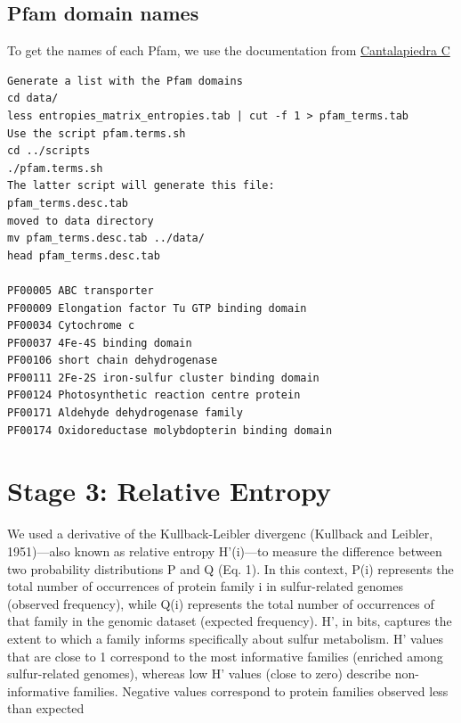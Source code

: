 \documentclass[a4paper,11pt]{report}
\begin{document}
\subsection{Pfam domain names}
To get the names of each Pfam, we use the documentation from \href{https://github.com/Cantalapiedra/pfam_terms}{Cantalapiedra C} 

\begin{verbatim}
Generate a list with the Pfam domains 
cd data/
less entropies_matrix_entropies.tab | cut -f 1 > pfam_terms.tab
Use the script pfam.terms.sh 
cd ../scripts
./pfam.terms.sh 
The latter script will generate this file:
pfam_terms.desc.tab
moved to data directory 
mv pfam_terms.desc.tab ../data/
head pfam_terms.desc.tab 

PF00005	ABC transporter
PF00009	Elongation factor Tu GTP binding domain
PF00034	Cytochrome c
PF00037	4Fe-4S binding domain
PF00106	short chain dehydrogenase
PF00111	2Fe-2S iron-sulfur cluster binding domain
PF00124	Photosynthetic reaction centre protein
PF00171	Aldehyde dehydrogenase family
PF00174	Oxidoreductase molybdopterin binding domain
\end{verbatim}

\section{Stage 3: Relative Entropy}
\label{stage3}

We used a derivative of the Kullback-Leibler divergenc 
(Kullback and Leibler, 1951)—also known as relative entropy 
H’(i)—to measure the difference between two probability 
distributions P and Q (Eq. 1). In this context, P(i) 
represents the total number of occurrences of protein 
family i in sulfur-related genomes (observed frequency), 
while Q(i) represents the total number of occurrences of 
that family in the genomic dataset (expected frequency). 
H’, in bits, captures the extent to which a family informs 
specifically about sulfur metabolism. H’ values that are 
close to 1 correspond to the most informative families 
(enriched among sulfur-related genomes), whereas low H’ 
values (close to zero) describe non-informative families. 
Negative values correspond to protein families observed 
less than expected

\end{document}
